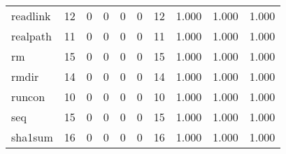\begin{longtable}{lp{1.3cm}p{1.3cm}p{1.3cm}p{1.3cm}p{1.3cm}p{1.3cm}p{1.3cm}p{1.3cm}p{1.3cm}}
readlink  &                     12 &                                             0 &                                            0 &                                           0 &                                            0 &                                         12 &                                1.000 &                                  1.000 &                                1.000 \\
realpath  &                     11 &                                             0 &                                            0 &                                           0 &                                            0 &                                         11 &                                1.000 &                                  1.000 &                                1.000 \\
rm        &                     15 &                                             0 &                                            0 &                                           0 &                                            0 &                                         15 &                                1.000 &                                  1.000 &                                1.000 \\
rmdir     &                     14 &                                             0 &                                            0 &                                           0 &                                            0 &                                         14 &                                1.000 &                                  1.000 &                                1.000 \\
runcon    &                     10 &                                             0 &                                            0 &                                           0 &                                            0 &                                         10 &                                1.000 &                                  1.000 &                                1.000 \\
seq       &                     15 &                                             0 &                                            0 &                                           0 &                                            0 &                                         15 &                                1.000 &                                  1.000 &                                1.000 \\
sha1sum   &                     16 &                                             0 &                                            0 &                                           0 &                                            0 &                                         16 &                                1.000 &                                  1.000 &                                1.000 \\

\end{longtable}
